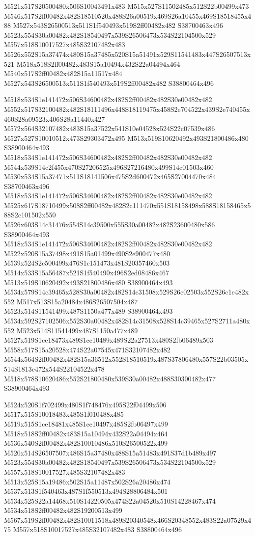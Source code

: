 \documentclass{article}
\begin{document}
\begin{multicols}{2}
M521x517S20500480x506S10043491x483 M515x527S11502485x512S22b00499x473 M546x517S2ff00482x482S18510520x488S26a00519x469S26a10455x469S18518455x488 M527x543S26500513x511S1f540493x519S2ff00482x482 S38700463x496 M523x554S30a00482x482S18540497x539S26506473x534S22104500x529 M557x518S10017527x485S32107482x483 M526x552S15a37474x480S15a37485x520S15a51491x529S11541483x447S26507513x521 M518x518S2ff00482x483S15a10494x432S22a04494x464 M540x517S2ff00482x482S15a11517x484 M527x543S26500513x511S1f540493x519S2ff00482x482 S38800464x496

M518x534S1e141472x506S34600482x482S2ff00482x482S30e00482x482 M552x517S32100482x482S18111496x448S18119475x458S2e704522x439S2e740455x460S28a09523x406S28a11440x427 M572x564S32107482x483S15a37522x541S10e04528x524S22c07539x486 M527x527S10010512x473S29303472x495 M513x519S10620492x493S21800486x480 S38900464x493 M518x534S1e141472x506S34600482x482S2ff00482x482S30e00482x482 M544x539S14c2f455x470S27206525x496S27216480x499S14c01503x460 M530x534S15a37471x511S18141506x475S2d600472x465S27004470x484 S38700463x496 M518x534S1e141472x506S34600482x482S2ff00482x482S30e00482x482 M525x617S18710499x508S2ff00482x482S2c111470x551S18158498x588S18158465x588S2c101502x550 M526x603S14c31476x554S14c39500x555S30a00482x482S23600480x586 S38900464x493 M518x534S1e141472x506S34600482x482S2ff00482x482S30e00482x482 M522x520S15a37498x491S15a01499x490S2e900477x480 M539x524S2c500499x476S1c151473x481S20357460x503 M514x533S15a56487x521S1f540490x496S2ed08486x467 M513x519S10620492x493S21800486x480 S38900464x493 M534x579S14c39465x528S30a00482x482S14c31508x529S26c02503x552S26c1e482x552 M517x513S15a20484x486S26507504x487 M523x514S11541499x487S1150a477x489 S38900464x493 M534x592S27102506x552S30a00482x482S14c31508x528S14c39465x527S2711a480x552 M523x514S11541499x487S1150a477x489 M527x519S1ce18473x489S1ce10489x489S22a27513x480S2fb06489x503 M558x517S15a20528x474S22a07545x471S32107482x482 M544x564S2ff00482x482S15a36512x552S18510519x487S37806480x557S22b03505x514S1813e472x544S22104522x478 M518x578S10620486x552S21800480x539S30a00482x488S30300482x477 S38900464x493

M524x520S1f702499x480S1f748476x495S22f04499x506 M517x515S10018483x485S1f010488x485 M519x515S1ce18481x485S1ce10497x485S2fb06497x499 M518x518S2ff00482x483S15a10494x432S22a04494x464 M536x540S2ff00482x482S10010486x510S26500522x499 M520x514S26507507x486S15a37480x488S15a51483x491S37d1b489x497 M523x554S30a00482x482S18540497x539S26506473x534S22104500x529 M557x518S10017527x485S32107482x483 M513x525S15a19486x502S15a11487x502S26a20486x474 M537x513S1f540463x487S1f550513x494S28806484x501 M534x525S22a14468x510S14220505x474S22a04520x510S14228467x474 M534x518S2ff00482x482S19200513x499 M567x519S2ff00482x482S10011518x489S20340548x466S20348552x483S22a07529x475 M557x518S10017527x485S32107482x483 S38800464x496


\end{multicols}
\end{document}
